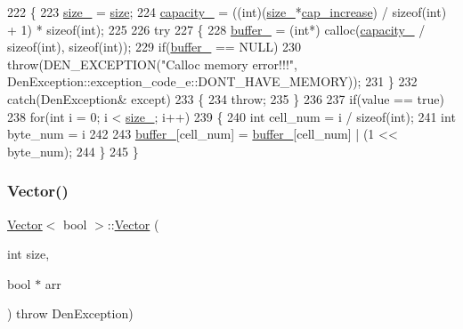 \begin{DoxyCode}
222     \{
223         \hyperlink{classVector_3_01bool_01_4_a07895adb41b2c819f85640e35c0d4ae0}{size\_} = \hyperlink{classVector_3_01bool_01_4_acb9a245334b171ea1ad0d9bda20da76e}{size};
224         \hyperlink{classVector_3_01bool_01_4_ac3da0e4580bca55cab445ed3f9c50f2d}{capacity\_} = ((int)(\hyperlink{classVector_3_01bool_01_4_a07895adb41b2c819f85640e35c0d4ae0}{size\_}*\hyperlink{classVector_3_01bool_01_4_a6fe84e4e9414012807ec5ccd49711e62}{cap\_increase}) / \textcolor{keyword}{sizeof}(int) + 1) * \textcolor{keyword}{sizeof}(int);
225 
226         \textcolor{keywordflow}{try}
227             \{
228                 \hyperlink{classVector_3_01bool_01_4_ae2183c11de877eb13209c6a5a593604f}{buffer\_} = (\textcolor{keywordtype}{int}*) calloc(\hyperlink{classVector_3_01bool_01_4_ac3da0e4580bca55cab445ed3f9c50f2d}{capacity\_} / \textcolor{keyword}{sizeof}(\textcolor{keywordtype}{int}), \textcolor{keyword}{sizeof}(int));
229                 \textcolor{keywordflow}{if}(\hyperlink{classVector_3_01bool_01_4_ae2183c11de877eb13209c6a5a593604f}{buffer\_} == NULL)
230                     \textcolor{keywordflow}{throw}(DEN\_EXCEPTION(\textcolor{stringliteral}{"Calloc memory error!!!"}, 
      DenException::exception\_code\_e::DONT\_HAVE\_MEMORY));
231             \}
232         \textcolor{keywordflow}{catch}(DenException& except)
233             \{
234                 \textcolor{keywordflow}{throw};
235             \}
236 
237         \textcolor{keywordflow}{if}(value == \textcolor{keyword}{true})
238             \textcolor{keywordflow}{for}(\textcolor{keywordtype}{int} i = 0; i < \hyperlink{classVector_3_01bool_01_4_a07895adb41b2c819f85640e35c0d4ae0}{size\_}; i++)
239                 \{
240                     \textcolor{keywordtype}{int} cell\_num = i / \textcolor{keyword}{sizeof}(int);
241                     \textcolor{keywordtype}{int} byte\_num = i %
242 
243                     \hyperlink{classVector_3_01bool_01_4_ae2183c11de877eb13209c6a5a593604f}{buffer\_}[cell\_num] = \hyperlink{classVector_3_01bool_01_4_ae2183c11de877eb13209c6a5a593604f}{buffer\_}[cell\_num] | (1 << byte\_num);
244                 \}
245     \}
\end{DoxyCode}
\mbox{\label{classVector_3_01bool_01_4_ae05a09ad6a197974abbf6ed0e07289b9}} 
\subsubsection{\texorpdfstring{Vector()}{Vector()}\hspace{0.1cm}{\footnotesize\ttfamily [3/5]}}
{\footnotesize\ttfamily \hyperlink{classVector}{Vector}$<$ bool $>$\+::\hyperlink{classVector}{Vector} (\begin{DoxyParamCaption}\item[{int}]{size,  }\item[{bool $\ast$}]{arr }\end{DoxyParamCaption}) throw  Den\+Exception) }



